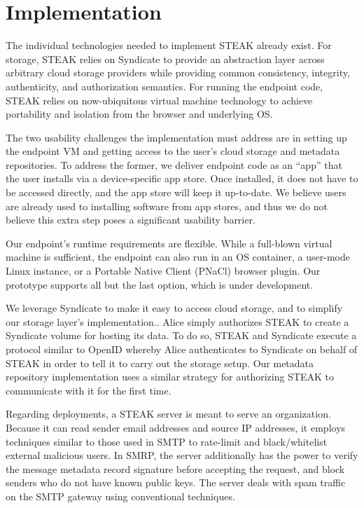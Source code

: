 \section{Implementation}

The individual technologies needed to implement STEAK already exist.  For storage, STEAK relies on Syndicate to provide an abstraction layer across arbitrary cloud storage providers while providing common consistency, integrity, authenticity, and authorization semantics.  For running the endpoint code, STEAK relies on now-ubiquitous virtual machine technology to achieve portability and isolation from the browser and underlying OS.

The two usability challenges the implementation must address are in setting up the endpoint VM and getting access to the user’s cloud storage and metadata repositories.  To address the former, we deliver endpoint code as an “app” that the user installs via a device-specific app store.  Once installed, it does not have to be accessed directly, and the app store will keep it up-to-date.  We believe users are already used to installing software from app stores, and thus we do not believe this extra step poses a significant usability barrier.

Our endpoint’s runtime requirements are flexible.  While a full-blown virtual machine is sufficient, the endpoint can also run in an OS container, a user-mode Linux instance, or a Portable Native Client (PNaCl) browser plugin.  Our prototype supports all but the last option, which is under development.

We leverage Syndicate to make it easy to access cloud storage, and to simplify our storage layer’s implementation..  Alice simply authorizes STEAK to create a Syndicate volume for hosting its data.  To do so, STEAK and Syndicate execute a protocol similar to OpenID whereby Alice authenticates to Syndicate on behalf of STEAK in order to tell it to carry out the storage setup.  Our metadata repository implementation uses a similar strategy for authorizing STEAK to communicate with it for the first time.

Regarding deployments, a STEAK server is meant to serve an organization.  Because it can read sender email addresses and source IP addresses, it employs techniques similar to those used in SMTP to rate-limit and black/whitelist external malicious users.  In SMRP, the server additionally has the power to verify the message metadata record signature before accepting the request, and block senders who do not have known public keys.  The server deals with spam traffic on the SMTP gateway using conventional techniques.

